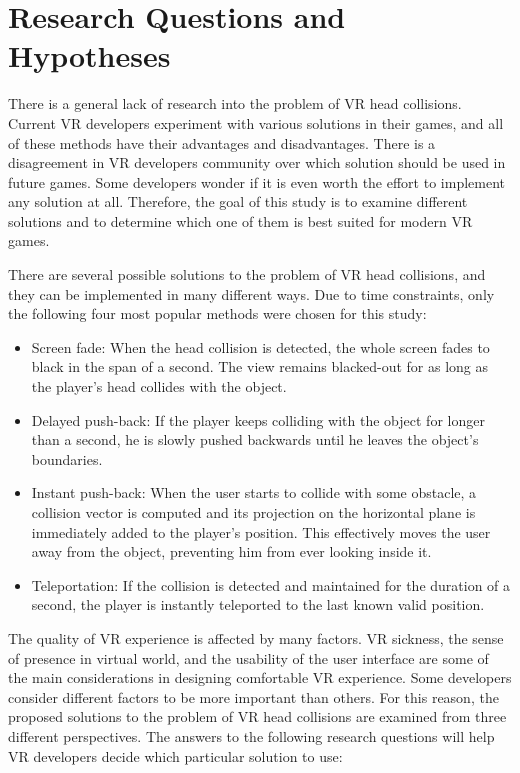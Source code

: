 \section{Research Questions and Hypotheses}

There is a general lack of research into the problem of VR head collisions. Current VR developers experiment with various solutions in their games, and all of these methods have their advantages and disadvantages. There is a disagreement in VR developers community over which solution should be used in future games. Some developers wonder if it is even worth the effort to implement any solution at all. Therefore, the goal of this study is to examine different solutions and to determine which one of them is best suited for modern VR games.
 
There are several possible solutions to the problem of VR head collisions, and they can be implemented in many different ways. Due to time constraints, only the following four most popular methods were chosen for this study:

\begin{itemize}
\item Screen fade: When the head collision is detected, the whole screen fades to black in the span of a second. The view remains blacked-out for as long as the player's head collides with the object.
\item Delayed push-back: If the player keeps colliding with the object for longer than a second, he is slowly pushed backwards until he leaves the object's boundaries.
\item Instant push-back: When the user starts to collide with some obstacle, a collision vector is computed and its projection on the horizontal plane is immediately added to the player's position. This effectively moves the user away from the object, preventing him from ever looking inside it.
\item Teleportation: If the collision is detected and maintained for the duration of a second, the player is instantly teleported to the last known valid position. 
\end{itemize}

The quality of VR experience is affected by many factors. VR sickness, the sense of presence in virtual world, and the usability of the user interface are some of the main considerations in designing comfortable VR experience. Some developers consider different factors to be more important than others. For this reason, the proposed solutions to the problem of VR head collisions are examined from three different perspectives. The answers to the following research questions will help VR developers decide which particular solution to use:

